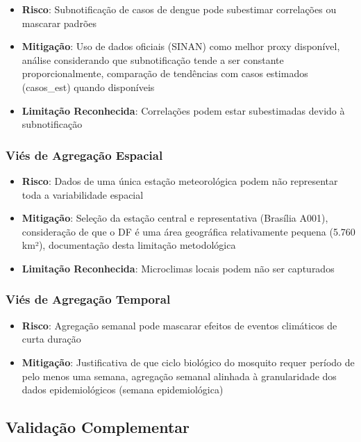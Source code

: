 \begin{itemize}
    \item \textbf{Risco}: Subnotificação de casos de dengue pode subestimar correlações ou mascarar padrões
    \item \textbf{Mitigação}: Uso de dados oficiais (SINAN) como melhor proxy disponível, análise considerando que subnotificação tende a ser constante proporcionalmente, comparação de tendências com casos estimados (casos\_est) quando disponíveis
    \item \textbf{Limitação Reconhecida}: Correlações podem estar subestimadas devido à subnotificação
\end{itemize}

\subsubsection{Viés de Agregação Espacial}

\begin{itemize}
    \item \textbf{Risco}: Dados de uma única estação meteorológica podem não representar toda a variabilidade espacial
    \item \textbf{Mitigação}: Seleção da estação central e representativa (Brasília A001), consideração de que o DF é uma área geográfica relativamente pequena (5.760 km²), documentação desta limitação metodológica
    \item \textbf{Limitação Reconhecida}: Microclimas locais podem não ser capturados
\end{itemize}

\subsubsection{Viés de Agregação Temporal}

\begin{itemize}
    \item \textbf{Risco}: Agregação semanal pode mascarar efeitos de eventos climáticos de curta duração
    \item \textbf{Mitigação}: Justificativa de que ciclo biológico do mosquito requer período de pelo menos uma semana, agregação semanal alinhada à granularidade dos dados epidemiológicos (semana epidemiológica)
\end{itemize}

\subsection{Validação Complementar}

